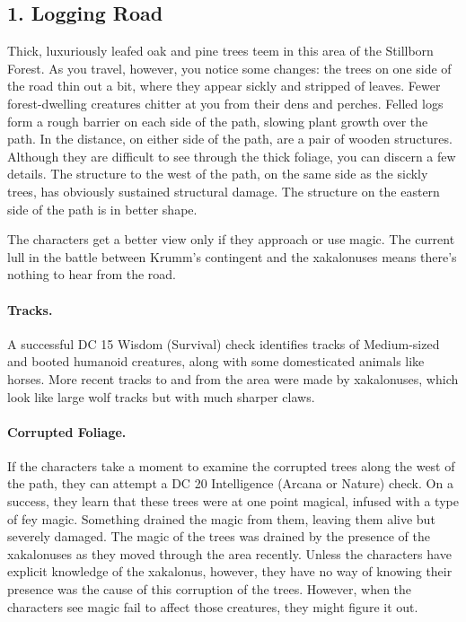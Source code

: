 \documentclass[10pt,a4paper,twoside,twocolumn,openany,bg=print,nodeprecatedcode]{dndbook}
\begin{document}
\subsection{1. Logging Road}
\begin{DndReadAloud}{}
Thick, luxuriously leafed oak and pine trees teem in this area of the Stillborn Forest. As you travel, however, you notice some changes: the trees on one side of the road thin out a bit, where they appear sickly and stripped of leaves. Fewer forest-dwelling creatures chitter at you from their dens and perches. Felled logs form a rough barrier on each side of the path, slowing plant growth over the path.
In the distance, on either side of the path, are a pair of wooden structures. Although they are difficult to see through the thick foliage, you can discern a few details. The structure to the west of the path, on the same side as the sickly trees, has obviously sustained structural damage. The structure on the eastern side of the path is in better shape.
\end{DndReadAloud}

The characters get a better view only if they approach or use magic. The current lull in the battle between Krumm's contingent and the xakalonuses means there's nothing to hear from the road.
\paragraph{Tracks.}
A successful DC 15 Wisdom (Survival) check identifies tracks of Medium-sized and booted humanoid creatures, along with some domesticated animals like horses. More recent tracks to and from the area were made by xakalonuses, which look like large wolf tracks but with much sharper claws.
\paragraph{Corrupted Foliage.}
If the characters take a moment to examine the corrupted trees along the west of the path, they can attempt a DC 20 Intelligence (Arcana or Nature) check. On a success, they learn that these trees were at one point magical, infused with a type of fey magic. Something drained the magic from them, leaving them alive but severely damaged.
The magic of the trees was drained by the presence of the xakalonuses as they moved through the area recently. Unless the characters have explicit knowledge of the xakalonus, however, they have no way of knowing their presence was the cause of this corruption of the trees. However, when the characters see magic fail to affect those creatures, they might figure it out.
\end{document}

